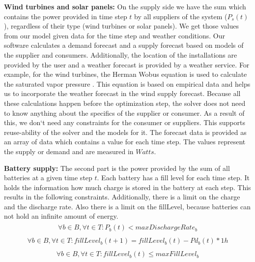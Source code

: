 \textbf{Wind turbines and solar panels:} On the supply side we have the sum which contains the power provided in time step $t$ by all suppliers of the system ($P_{s}(t)$), regardless of their type (wind turbines or solar panels).
We get those values from our model given data for the time step and weather conditions. 
Our software calculates a demand forecast and a supply forecast based on models of the supplier and consumers. 
Additionally, the location of the installations are provided by the user and a weather forecast is provided by a weather service. 
For example, for the wind turbines, the Herman Wobus equation is used to calculate the saturated vapor pressure \cite{NOAA}. 
This equation is based on empirical data and helps us to incorporate the weather forecast in the wind supply forecast. 
Because all these calculations happen before the optimization step, the solver does not need to know anything about the specifics of the supplier or consumer. As a result of this, we don`t need any constraints for the consumer or suppliers. 
This supports reuse-ability of the solver and the models for it. 
The forecast data is provided as an array of data which contains a value for each time step. 
The values represent the supply or demand and are measured in $Watts$.  %

\textbf{Battery supply:} The second part is the power provided by the sum of all batteries at a given time step $t$.  Each battery has a fill level for each time step. It holds the information how much charge is stored in the battery at each step. This results in the following constraints. Additionally, there is a limit on the charge and the discharge rate. Also there is a limit on the fillLevel, because batteries can not hold an infinite amount of energy.
\begin{align} \label{eq:limitDischarge}
\begin{split}
\forall b \in B, \forall t \in T: P_{b}(t) < maxDischargeRate_{b}
\end{split}
\end{align}
\begin{align} \label{eq:discharge100}
\begin{split}
\forall b \in B, \forall t \in T: fillLevel_{b}(t+1) = fillLevel_{b}(t) - Pd_{b}(t) * 1h
\end{split}
\end{align}
\begin{align} \label{eq:maxlimit}
\begin{split}
\forall b \in B, \forall t \in T: fillLevel_{b}(t) \le maxFillLevel_{b}
\end{split}
\end{align}

